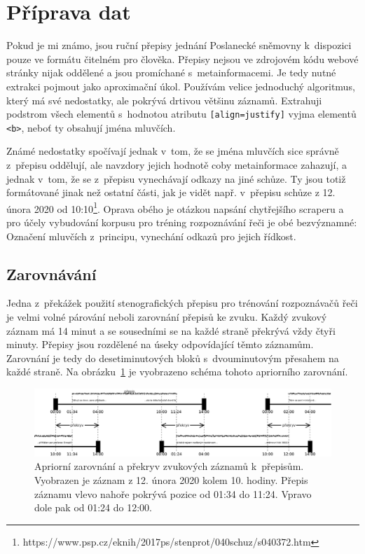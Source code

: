 \section{Příprava dat}

Pokud je mi známo, jsou ruční přepisy jednání Poslanecké sněmovny k~dispozici
pouze ve formátu čitelném pro člověka. Přepisy nejsou ve zdrojovém kódu webové
stránky nijak oddělené a jsou promíchané s~metainformacemi. Je tedy nutné
extrakci pojmout jako aproximační úkol. Používám velice jednoduchý algoritmus,
který má své nedostatky, ale pokrývá drtivou většinu záznamů. Extrahuji podstrom
všech elementů s~hodnotou atributu \texttt{[align=justify]} vyjma elementů
\texttt{<b>}, neboť ty obsahují jména mluvčích.

Známé nedostatky spočívají jednak v~tom, že se jména mluvčích sice správně z~přepisu
oddělují, ale navzdory jejich hodnotě coby metainformace zahazují, a jednak
v~tom, že se z~přepisu vynechávají odkazy na jiné schůze. Ty jsou totiž
formátované jinak než ostatní části, jak je vidět např. v~přepisu schůze z 12.
února 2020 od
10:10\footnote{https://www.psp.cz/eknih/2017ps/stenprot/040schuz/s040372.htm}.
Oprava obého je otázkou napsání chytřejšího scraperu a pro účely vybudování
korpusu pro tréning rozpoznávání řeči je obé bezvýznamné: Označení mluvčích
z~principu, vynechání odkazů pro jejich řídkost.

\subsection{Zarovnávání}
\label{subsec:svolocz:zarovnavani}

Jedna z~překážek použití stenografických přepisu pro trénování rozpoznávačů řeči
je velmi volné párování neboli zarovnání přepisů ke zvuku. Každý zvukový záznam
má 14 minut a se sousedními se na každé straně překrývá vždy čtyři minuty.
Přepisy jsou rozdělené na úseky odpovídající těmto záznamům. Zarovnání je tedy
do desetiminutových bloků s~dvouminutovým přesahem na každé straně. Na
obrázku~\ref{fig:svolocz:overlap} je vyobrazeno schéma tohoto apriorního
zarovnání.

\begin{figure}[htpb]
\includegraphics[scale=0.25]{rc/svolocz-overlap.eps}
\caption{Apriorní zarovnání a překryv zvukových záznamů k~přepisům. Vyobrazen je
záznam z 12. února 2020 kolem 10. hodiny. Přepis záznamu vlevo nahoře pokrývá
pozice od 01:34 do 11:24. Vpravo dole pak od 01:24 do 12:00.}
\label{fig:svolocz:overlap}
\end{figure}

